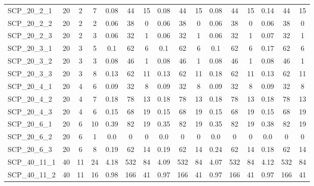 \begin{sidewaystable}[!ht]
{\begin{tabular}{lccccccccccccccc}
SCP\_20\_2\_1 & 20 & 2 & 7 &  \textcolor{blue2}{0.08} & 44 & 15 &  \textcolor{blue2}{0.08} & 44 & 15 &  \textcolor{blue2}{0.08} & 44 & 15 & 0.14 & 44 & 15 \\
SCP\_20\_2\_2 & 20 & 2 & 2 &  \textcolor{blue2}{0.06} & 38 & 0 &  \textcolor{blue2}{0.06} & 38 & 0 &  \textcolor{blue2}{0.06} & 38 & 0 &  \textcolor{blue2}{0.06} & 38 & 0 \\
SCP\_20\_2\_3 & 20 & 2 & 3 &  \textcolor{blue2}{0.06} & 32 & 1 &  \textcolor{blue2}{0.06} & 32 & 1 &  \textcolor{blue2}{0.06} & 32 & 1 & 0.07 & 32 & 1 \\
SCP\_20\_3\_1 & 20 & 3 & 5 &  \textcolor{blue2}{0.1} & 62 & 6 &  \textcolor{blue2}{0.1} & 62 & 6 &  \textcolor{blue2}{0.1} & 62 & 6 & 0.17 & 62 & 6 \\
SCP\_20\_3\_2 & 20 & 3 & 3 &  \textcolor{blue2}{0.08} & 46 & 1 &  \textcolor{blue2}{0.08} & 46 & 1 &  \textcolor{blue2}{0.08} & 46 & 1 &  \textcolor{blue2}{0.08} & 46 & 1 \\
SCP\_20\_3\_3 & 20 & 3 & 8 &  \textcolor{blue2}{0.13} & 62 & 11 &  \textcolor{blue2}{0.13} & 62 & 11 & 0.18 & 62 & 11 &  \textcolor{blue2}{0.13} & 62 & 11 \\
SCP\_20\_4\_1 & 20 & 4 & 6 &  \textcolor{blue2}{0.09} & 32 & 8 &  \textcolor{blue2}{0.09} & 32 & 8 &  \textcolor{blue2}{0.09} & 32 & 8 &  \textcolor{blue2}{0.09} & 32 & 8 \\
SCP\_20\_4\_2 & 20 & 4 & 7 &  \textcolor{blue2}{0.18} & 78 & 13 &  \textcolor{blue2}{0.18} & 78 & 13 &  \textcolor{blue2}{0.18} & 78 & 13 &  \textcolor{blue2}{0.18} & 78 & 13 \\
SCP\_20\_4\_3 & 20 & 4 & 6 &  \textcolor{blue2}{0.15} & 68 & 19 &  \textcolor{blue2}{0.15} & 68 & 19 &  \textcolor{blue2}{0.15} & 68 & 19 &  \textcolor{blue2}{0.15} & 68 & 19 \\
SCP\_20\_6\_1 & 20 & 6 & 10 & 0.39 & 82 & 19 &  \textcolor{blue2}{0.35} & 82 & 19 &  \textcolor{blue2}{0.35} & 82 & 19 & 0.38 & 82 & 19 \\
SCP\_20\_6\_2 & 20 & 6 & 1 &  \textcolor{blue2}{0.0} & 0 & 0 &  \textcolor{blue2}{0.0} & 0 & 0 &  \textcolor{blue2}{0.0} & 0 & 0 &  \textcolor{blue2}{0.0} & 0 & 0 \\
SCP\_20\_6\_3 & 20 & 6 & 8 & 0.19 & 62 & 14 & 0.19 & 62 & 14 & 0.24 & 62 & 14 &  \textcolor{blue2}{0.18} & 62 & 14 \\
SCP\_40\_11\_1 & 40 & 11 & 24 & 4.18 & 532 & 84 & 4.09 & 532 & 84 &  \textcolor{blue2}{4.07} & 532 & 84 & 4.12 & 532 & 84 \\
SCP\_40\_11\_2 & 40 & 11 & 16 & 0.98 & 166 & 41 &  \textcolor{blue2}{0.97} & 166 & 41 &  \textcolor{blue2}{0.97} & 166 & 41 &  \textcolor{blue2}{0.97} & 166 & 41 \\

\end{tabular}}
\end{sidewaystable}
